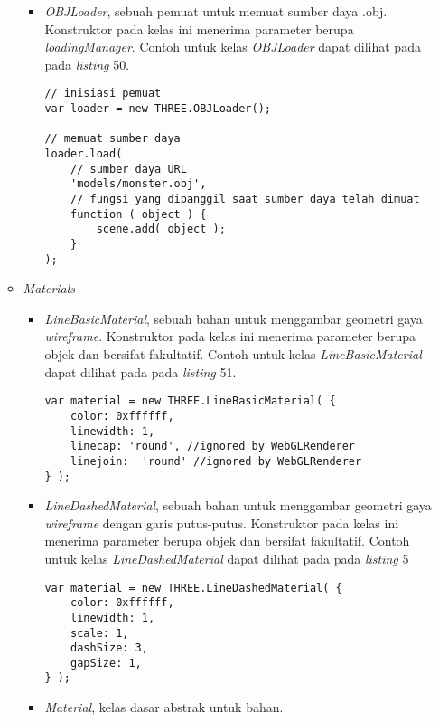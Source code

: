 \documentclass[a4paper,twoside]{article}
\begin{document}
\begin{enumerate}
\begin{itemize}
\begin{itemize}
	\item {\it OBJLoader}, sebuah pemuat untuk memuat sumber daya .obj. Konstruktor pada kelas ini menerima parameter berupa  {\it loadingManager}. Contoh untuk kelas {\it OBJLoader} dapat dilihat pada pada {\it listing} 50.
	
\begin{lstlisting}[caption={Contoh penggunaan kelas {\it OBJLoader}.},captionpos=b]
// inisiasi pemuat
var loader = new THREE.OBJLoader();

// memuat sumber daya
loader.load(
	// sumber daya URL
	'models/monster.obj',
	// fungsi yang dipanggil saat sumber daya telah dimuat
	function ( object ) {
		scene.add( object );
	}
);
\end{lstlisting}
	\end{itemize}

\item \textit{Materials}

	\begin{itemize}
	\item {\it LineBasicMaterial}, sebuah bahan untuk menggambar geometri gaya {\it wireframe}. Konstruktor pada kelas ini menerima parameter berupa objek dan bersifat fakultatif. Contoh untuk kelas {\it LineBasicMaterial} dapat dilihat pada pada {\it listing} 51.
	
\begin{lstlisting}[caption={Contoh penggunaan kelas {\it LineBasicMaterial}.},captionpos=b]
var material = new THREE.LineBasicMaterial( {
	color: 0xffffff,
	linewidth: 1,
	linecap: 'round', //ignored by WebGLRenderer
	linejoin:  'round' //ignored by WebGLRenderer
} );
\end{lstlisting}

	\item {\it LineDashedMaterial}, sebuah bahan untuk menggambar geometri gaya {\it wireframe} dengan garis putus-putus. Konstruktor pada kelas ini menerima parameter berupa objek dan bersifat fakultatif. Contoh untuk kelas {\it LineDashedMaterial} dapat dilihat pada pada {\it listing} 5
	
\begin{lstlisting}[caption={Contoh penggunaan kelas {\it LineDashMaterial}.},captionpos=b]
var material = new THREE.LineDashedMaterial( {
	color: 0xffffff,
	linewidth: 1,
	scale: 1,
	dashSize: 3,
	gapSize: 1,
} );
\end{lstlisting}

	\item {\it Material}, kelas dasar abstrak untuk bahan.
	

\end{itemize}
\end{itemize}
\end{enumerate}
\end{document}
